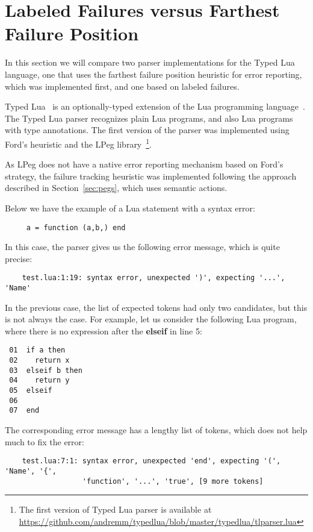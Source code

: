 \documentclass[3p,12pt,singlecolumn]{elsarticle}
\begin{document}
\section{Labeled Failures versus Farthest Failure Position}
\label{sec:labelsfft}

In this section we will compare two parser implementations for
the Typed Lua language, one that uses the farthest failure
position heuristic for error reporting, which was implemented
first, and one based on labeled failures.

Typed Lua~\cite{maidl2014typedlua} is an optionally-typed
extension of the Lua programming language~\cite{lua}.
The Typed Lua parser recognizes plain Lua programs, and
also Lua programs with type annotations. The first version
of the parser was implemented using Ford's
heuristic and the LPeg library~\footnote{The first version of Typed Lua parser is available at
\url{https://github.com/andremm/typedlua/blob/master/typedlua/tlparser.lua}}.

As LPeg does not have a native error reporting mechanism based
on Ford's strategy, the failure tracking heuristic was implemented
following the approach described in Section~\ref{sec:pegs},
which uses semantic actions.

Below we have the example of a Lua statement with a syntax error:
\begin{verbatim}
     a = function (a,b,) end
\end{verbatim}

In this case, the parser gives us the following error message,
which is quite precise:
\begin{verbatim}
    test.lua:1:19: syntax error, unexpected ')', expecting '...', 'Name'
\end{verbatim}

In the previous case, the list of expected tokens had only two
candidates, but this is not always the case. For example, let us
consider the following Lua program, where there is no expression
after the \textbf{elseif} in line 5:
\begin{verbatim}
 01  if a then
 02    return x
 03  elseif b then
 04    return y
 05  elseif
 06
 07  end
\end{verbatim}

The corresponding error message has a lengthy list of tokens,
which does not help much to fix the error:
\begin{verbatim}
    test.lua:7:1: syntax error, unexpected 'end', expecting '(', 'Name', '{', 
                  'function', '...', 'true', [9 more tokens] 
\end{verbatim}
\end{document}
